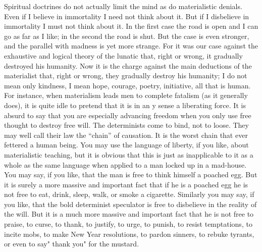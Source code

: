 \documentclass{book}
\begin{document}
Spiritual doctrines do not actually limit the mind as do materialistic denials. Even if I believe in immortality I need not think about it. But if I disbelieve in immortality I must not think about it. In the first case the road is open and I can go as far as I like; in the second the road is shut. But the case is even stronger, and the parallel with madness is yet more strange. For it was our case against the exhaustive and logical theory of the lunatic that, right or wrong, it gradually destroyed his humanity. Now it is the charge against the main deductions of the materialist that, right or wrong, they gradually destroy his humanity; I do not mean only kindness, I mean hope, courage, poetry, initiative, all that is human. For instance, when materialism leads men to complete fatalism (as it generally does), it is quite idle to pretend that it is in an y sense a liberating force. It is absurd to say that you are especially advancing freedom when you only use free thought to destroy free will. The determinists come to bind, not to loose. They may well call their law the “chain” of causation. It is the worst chain that ever fettered a human being. You may use the language of liberty, if you like, about materialistic teaching, but it is obvious that this is just as inapplicable to it as a whole as the same language when applied to a man locked up in a mad-house. You may say, if you like, that the man is free to think himself a poached egg. But it is surely a more massive and important fact that if he is a poached egg he is not free to eat, drink, sleep, walk, or smoke a cigarette. Similarly you may say, if you like, that the bold determinist speculator is free to disbelieve in the reality of the will. But it is a much more massive and important fact that he is not free to praise, to curse, to thank, to justify, to urge, to punish, to resist temptations, to incite mobs, to make New Year resolutions, to pardon sinners, to rebuke tyrants, or even to say" thank you" for the mustard.
\end{document}
